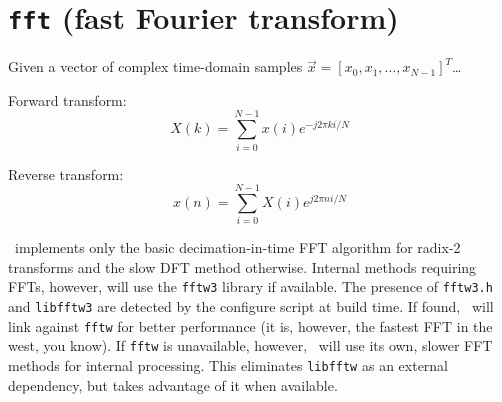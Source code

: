 % 
%

\section{{\tt fft} (fast Fourier transform)}
\label{module:fft}

Given a vector of complex time-domain samples
$\vec{x} = \left[x_0,x_1,\ldots,x_{N-1}\right]^T$\ldots

Forward transform:
\[
    X(k) = \sum_{i=0}^{N-1}{x(i) e^{-j 2 \pi k i/N}}
\]

Reverse transform:
\[
    x(n) = \sum_{i=0}^{N-1}{X(i) e^{ j 2 \pi n i/N}}
\]

\liquid\ implements only the basic decimation-in-time FFT algorithm for
radix-2 transforms and the slow DFT method otherwise.
Internal methods requiring FFTs, however, will use the {\tt fftw3} library
\cite{fftw:web} if available.
The presence of {\tt fftw3.h} and {\tt libfftw3} are detected by the configure
script at build time.
If found, \liquid\ will link against {\tt fftw} for better performance (it is,
however, the fastest FFT in the west, you know).
If {\tt fftw} is unavailable, however, \liquid\ will use its own, slower FFT
methods for internal processing.
This eliminates {\tt libfftw} as an external dependency, but takes advantage
of it when available.


